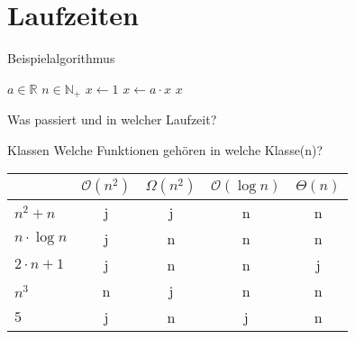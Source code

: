 \section{Laufzeiten}
\begin{frame}{Beispielalgorithmus}
    \begin{algorithm}
        \begin{algorithmic}
            \Require $a \in \mathbb{R}$
            \Require $n \in \mathbb{N}_+$
            \State $x \gets 1$
                \State $x\gets a\cdot x$
            \EndFor
            \Ensure $x$
        \end{algorithmic}
    \end{algorithm}
    Was passiert und in welcher Laufzeit?
\end{frame}
\begin{frame}{Klassen}
    Welche Funktionen gehören in welche Klasse(n)?
    \begin{table}
        \centering
        \begin{tabular}{lcccc}
            \toprule
            & $\mathcal{O}\left( n^2 \right)$ & $\Omega\left( n^2 \right)$ & $\mathcal{O}\left( \log n \right)$ & $\Theta\left( n \right)$\\
             \midrule
             $n^2 + n$ & j & j & n & n\\
             $n\cdot \log n$ & j & n & n & n\\
             $2\cdot n + 1$ & j & n & n & j\\
             $n^3$ & n & j & n & n\\
             $5$ & j & n & j & n\\
             \bottomrule
        \end{tabular}
    \end{table}
\end{frame}


